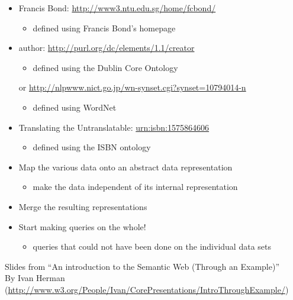 \documentclass[a4paper,landscape,headrule,footrule,xetex]{foils}
\begin{document}
\begin{itemize}
    \item Francis Bond: \url{http://www3.ntu.edu.sg/home/fcbond/}
      \begin{itemize}
      \item defined using Francis Bond's homepage 
      \end{itemize}
    \item author: \url{http://purl.org/dc/elements/1.1/creator} 
      \begin{itemize}
      \item  defined using the Dublin Core Ontology 
      \end{itemize}
  \item[or] \url{http://nlpwww.nict.go.jp/wn-synset.cgi?synset=10794014-n}
  \begin{itemize}
      \item  defined using WordNet
      \end{itemize}
    \item  Translating the Untranslatable: \url{urn:isbn:1575864606}
      \begin{itemize}
      \item  defined using the ISBN ontology
      \end{itemize}

  \end{itemize}


\begin{itemize}
\item Map the various data onto an abstract data representation
 \begin{itemize}
\item  make the data independent of its internal representation
\end{itemize}
\item Merge the resulting representations
\item Start making queries on the whole!
 \begin{itemize}
\item queries that could not have been done on the individual data sets
\end{itemize}
\end{itemize}

\begin{flushright}
  Slides from ``An introduction to the Semantic Web (Through an Example)'' 
  \\ By Ivan Herman (\url{http://www.w3.org/People/Ivan/CorePresentations/IntroThroughExample/})
\end{flushright}
\end{document}
